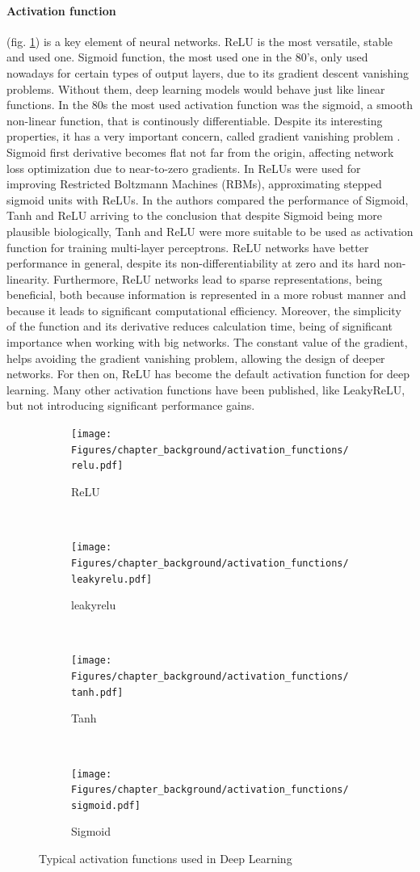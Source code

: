 \paragraph{Activation function} (fig. \ref{back:fig:activations}) is a key element of neural networks. ReLU is the most versatile, stable and used one. Sigmoid function, the most used one in the 80's, only used nowadays for certain types of output layers, due to its gradient descent vanishing problems. Without them, deep learning models would behave just like linear functions. In the 80s the most used activation function was the sigmoid, a smooth non-linear function, that is continously differentiable. Despite its interesting properties, it has a very important concern, called gradient vanishing problem \citep{glorot2010understanding}. Sigmoid first derivative becomes flat not far from the origin, affecting network loss optimization due to near-to-zero gradients. In \citep{nair2010rectified} ReLUs were used for improving Restricted Boltzmann Machines (RBMs), approximating stepped sigmoid units with ReLUs. In \citep{glorot2011deep} the authors compared the performance of Sigmoid, Tanh and ReLU arriving to the conclusion that despite Sigmoid being more plausible biologically, Tanh and ReLU were more suitable to be used as activation function for training multi-layer perceptrons. ReLU networks have better performance in general, despite its non-differentiability at zero and its hard non-linearity. Furthermore, ReLU networks lead to sparse representations, being beneficial, both because information is represented in a more robust manner and because it leads to significant computational efficiency. Moreover, the simplicity of the function and its derivative reduces calculation time, being of significant importance when working with big networks. The constant value of the gradient, helps avoiding the gradient vanishing problem, allowing the design of deeper networks. For then on, ReLU has become the default activation function for deep learning. Many other activation functions have been published, like LeakyReLU, but not introducing significant performance gains.

\begin{figure}[h!]
	\centering
	\begin{subfigure}{0.2\textwidth}
		\texttt{[image: Figures/chapter\_background/activation\_functions/relu.pdf]}
		\caption{ReLU}
	\end{subfigure} ~
	\begin{subfigure}{0.2\textwidth}
		\texttt{[image: Figures/chapter\_background/activation\_functions/leakyrelu.pdf]}
		\caption{leakyrelu}
	\end{subfigure} ~
	\begin{subfigure}{0.2\textwidth}
		\texttt{[image: Figures/chapter\_background/activation\_functions/tanh.pdf]}
		\caption{Tanh}
	\end{subfigure} ~
	\begin{subfigure}{0.2\textwidth}
		\texttt{[image: Figures/chapter\_background/activation\_functions/sigmoid.pdf]}
		\caption{Sigmoid}
	\end{subfigure}
	\caption{Typical activation functions used in Deep Learning}
	\label{back:fig:activations}
\end{figure}

